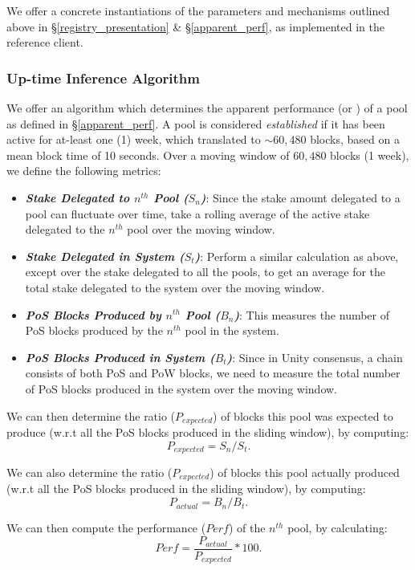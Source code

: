 We offer a concrete instantiations of the parameters and mechanisms outlined above in \S\ref{registry_presentation} \& \S\ref{apparent_perf}, as implemented in the reference client. 

\subsubsection{Up-time Inference Algorithm} \label{uptime_inference}

We offer an algorithm which determines the apparent performance (or ) of a pool as defined in \S\ref{apparent_perf}. A pool is considered \textit{established} if it has been active for at-least one (1) week, which translated to $\sim60,480$ blocks, based on a mean block time of 10 seconds. Over a moving window of $60,480$ blocks (1 week), we define the following metrics:
\begin{itemize}[label=--,nosep]
    \item \textbf{\textit{Stake Delegated to $n^{th}$ Pool (\textbf{${S}_n$})}}: Since the stake amount delegated to a pool can fluctuate over time, take a rolling average of the active stake delegated to the $n^{th}$ pool over the moving window.
    \item \textbf{\textit{Stake Delegated in System (\textbf{${S}_t$})}}: Perform a similar calculation as above, except over the stake delegated to all the pools, to get an average for the total stake delegated to the system over the moving window.
    \item \textbf{\textit{PoS Blocks Produced by $n^{th}$ Pool (\textbf{$B_n$})}}: This measures the number of PoS blocks produced by the $n^{th}$ pool in the system.
    \item \textbf{\textit{PoS Blocks Produced in System ($B_t$)}}: Since in Unity consensus, a chain consists of both PoS and PoW blocks, we need to measure the total number of PoS blocks produced in the system over the moving window.
\end{itemize}

We can then determine the ratio ($P_{expected}$) of blocks this pool was expected to produce (w.r.t all the PoS blocks produced in the sliding window), by computing:  $$ P_{expected} = S_n / S_t. $$ 

We can also determine the ratio ($P_{expected}$) of blocks this pool actually produced (w.r.t all the PoS blocks produced in the sliding window), by computing:  $$ P_{actual} = B_n / B_t. $$ 

We can then compute the performance ($Perf$) of the $n^{th}$ pool, by calculating: $$ Perf = \frac{P_{actual}}{P_{expected}} * 100. $$

